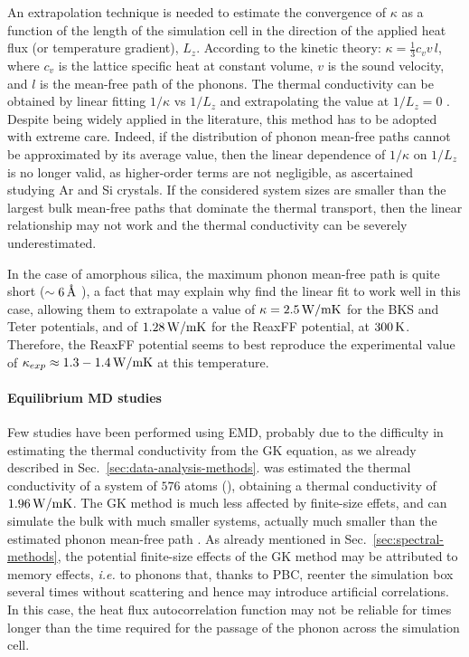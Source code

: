 An extrapolation technique is needed to estimate the convergence of $\kappa$ as a function of the length of the simulation cell in the direction of the applied heat flux (or temperature gradient), $L_z$. According to the kinetic theory: $\kappa = \frac{1}{3} c_v v \,l$, where $c_v$ is the lattice specific heat at constant volume, $v$ is the sound velocity, and $l$ is the mean-free path of the phonons. The thermal conductivity can be obtained by linear fitting $1/\kappa$ vs $1/L_z$ and extrapolating the value at $1/L_z=0$ \cite{Schelling2002}. 
Despite being widely applied in the literature, this method has to be adopted with extreme care. Indeed, if the distribution of phonon mean-free paths cannot be approximated by its average value, then the linear dependence of $1/\kappa$ on $1/L_z$ is no longer valid, as higher-order terms are not negligible, as \citet{Sellan2010} ascertained studying Ar and Si crystals. If the considered system sizes are smaller than the largest bulk mean-free paths that dominate the thermal transport, then the linear relationship may not work and the thermal conductivity can be severely underestimated.

In the case of amorphous silica, the maximum phonon mean-free path is quite short ($\sim 6\,\mathrm{{\mbox{\AA}}}$ \cite{Yu2006}), a fact that may explain why \citet{Tian2017} find the linear fit to work well in this case, allowing them to extrapolate a value of $\kappa=2.5\,\mathrm{W/mK}$ for the BKS and Teter potentials, and of $1.28\,\mathrm{W/mK}$ for the ReaxFF potential, at $300\,\mathrm{K}$. Therefore, the ReaxFF potential seems to best reproduce the experimental value of $\kappa_{exp}\approx 1.3-1.4\,\mathrm{W/mK}$ at this temperature. 


\paragraph{Equilibrium MD studies}
Few studies have been performed using EMD, probably due to the difficulty in estimating the thermal conductivity from the GK equation, as we already described in Sec.~\ref{sec:data-analysis-methods}.
\citet{McGaughey2004b} was estimated the thermal conductivity of a system of $576$ atoms (), obtaining a thermal conductivity of $1.96\,\mathrm{W/mK}$. 
The GK method is much less affected by finite-size effets, and can simulate the bulk with much smaller systems, actually much smaller than the estimated phonon mean-free path \cite{Schelling2002}. As already mentioned in Sec.~\ref{sec:spectral-methods}, the potential finite-size effects of the GK method may be attributed to memory effects, \emph{i.e.} to phonons that, thanks to PBC, reenter the simulation box several times without scattering and hence may introduce artificial correlations. In this case, the heat flux autocorrelation function may not be reliable for times longer than the time required for the passage of the phonon across the simulation cell. 


